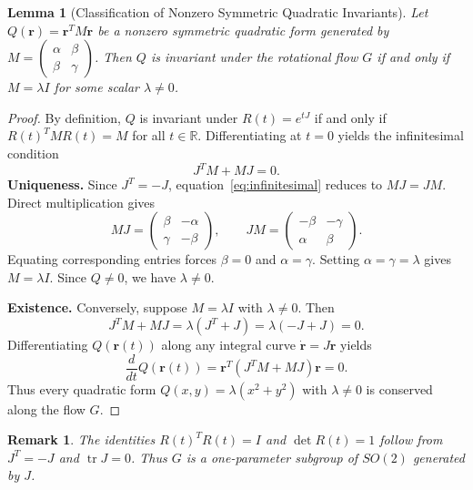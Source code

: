 \documentclass[11pt,a4paper]{article}
\newtheorem{lemma}{Lemma}[section]
\newtheorem{remark}{Remark}[section]
\begin{document}
\begin{lemma}[Classification of Nonzero Symmetric Quadratic Invariants]
Let $Q(\mathbf r)=\mathbf r^{T}M\mathbf r$ be a nonzero symmetric quadratic form generated by $M=\begin{pmatrix}\alpha&\beta\\\beta&\gamma\end{pmatrix}$. Then $Q$ is invariant under the rotational flow $G$ if and only if $M=\lambda I$ for some scalar $\lambda\ne0$.
\end{lemma}
\begin{proof}
By definition, $Q$ is invariant under $R(t)=e^{tJ}$ if and only if $R(t)^TMR(t)=M$ for all $t\in\mathbb{R}$. Differentiating at $t=0$ yields the infinitesimal condition
\begin{equation}\label{eq:infinitesimal}J^TM+MJ=0.\end{equation}
\textbf{Uniqueness.} Since $J^T=-J$, equation~\eqref{eq:infinitesimal} reduces to $MJ=JM$. Direct multiplication gives
\begin{equation}\label{eq:products}
MJ=\begin{pmatrix}\beta&-\alpha\\\gamma&-\beta\end{pmatrix},\qquad
JM=\begin{pmatrix}-\beta&-\gamma\\\alpha&\beta\end{pmatrix}.
\end{equation}
Equating corresponding entries forces $\beta=0$ and $\alpha=\gamma$. Setting $\alpha=\gamma=\lambda$ gives $M=\lambda I$. Since $Q\ne0$, we have $\lambda\ne0$.

\textbf{Existence.} Conversely, suppose $M=\lambda I$ with $\lambda\ne0$. Then
\begin{equation}
J^TM+MJ=\lambda(J^T+J)=\lambda(-J+J)=0.
\end{equation}
Differentiating $Q(\mathbf r(t))$ along any integral curve $\dot{\mathbf r}=J\mathbf r$ yields
\begin{equation}
\frac{d}{dt}Q(\mathbf r(t))=\mathbf r^T(J^TM+MJ)\mathbf r=0.
\end{equation}
Thus every quadratic form $Q(x,y)=\lambda(x^2+y^2)$ with $\lambda\ne0$ is conserved along the flow $G$.
\end{proof}

\begin{remark}
The identities $R(t)^TR(t)=I$ and $\det R(t)=1$ follow from $J^T=-J$ and $\operatorname{tr}J=0$. Thus $G$ is a one-parameter subgroup of $SO(2)$ generated by $J$.
\end{remark}
\end{document}

